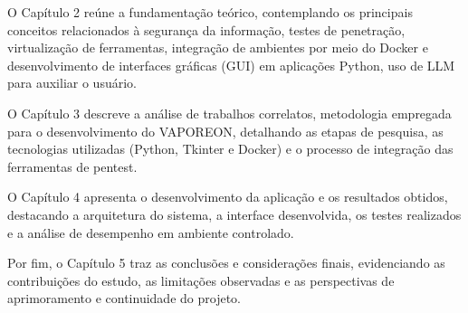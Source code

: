     O Capítulo 2 reúne a fundamentação teórico, contemplando os principais conceitos relacionados à segurança da informação,
    testes de penetração, virtualização de ferramentas, integração de ambientes por meio do Docker e desenvolvimento de interfaces
    gráficas (GUI) em aplicações Python, uso de LLM para auxiliar o usuário.

    O Capítulo 3 descreve a análise de trabalhos correlatos, metodologia empregada para o desenvolvimento do VAPOREON, detalhando as etapas de pesquisa,
    as tecnologias utilizadas (Python, Tkinter e Docker) e o processo de integração das ferramentas de pentest.

    O Capítulo 4 apresenta o desenvolvimento da aplicação e os resultados obtidos, destacando a arquitetura do sistema,
    a interface desenvolvida, os testes realizados e a análise de desempenho em ambiente controlado.

    Por fim, o Capítulo 5 traz as conclusões e considerações finais, evidenciando as contribuições do estudo,
    as limitações observadas e as perspectivas de aprimoramento e continuidade do projeto.

